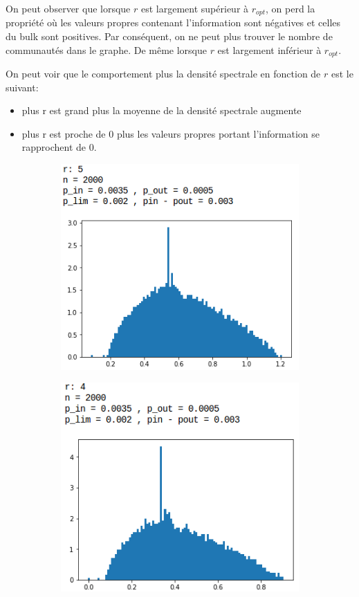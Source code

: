 On peut observer que lorsque $r$ est largement supérieur à $r_{opt}$, on perd la propriété où les valeurs propres contenant l'information sont négatives et celles du bulk sont positives.
Par conséquent, on ne peut plus trouver le nombre de communautés dans le graphe.
De même lorsque $r$ est largement inférieur à $r_{opt}$.

On peut voir que le comportement plus la densité spectrale en fonction de $r$ est le suivant:
\begin{itemize}
	\item plus r est grand plus la moyenne de la densité spectrale augmente
	\item plus r est proche de 0 plus les valeurs propres portant l'information se rapprochent de 0.
\end{itemize}

\begin{figure}[H]
	\begin{subfigure}{.5\textwidth}
		\centering
		\includegraphics[scale=0.4]{static/bh_5.png}
		\label{bh5}
	\end{subfigure}
	\begin{subfigure}{.5\textwidth}
		\centering
		\includegraphics[scale=0.4]{static/bh_3.png}

\end{subfigure}
\end{figure}
